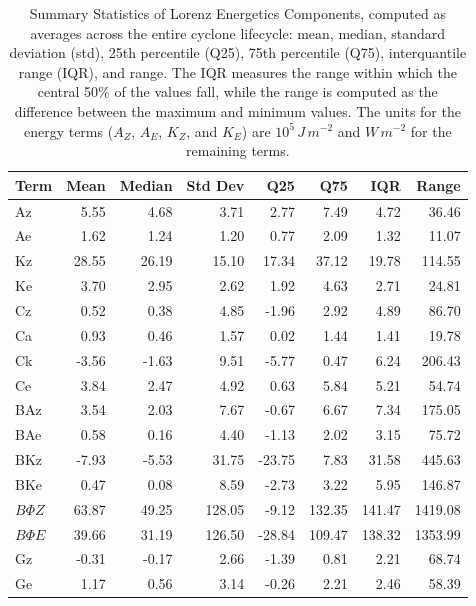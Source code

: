 \documentclass[pdflatex,sn-chicago]{sn-jnl}%
\theoremstyle{plain}
\theoremstyle{definition}
\theoremstyle{remark}
\theoremstyle{definition}
\begin{document}
\begin{table}[!htbp]
\centering
\caption[Summary Statistics of Lorenz Energetics Components]{Summary Statistics of Lorenz Energetics Components, computed as averages across the entire cyclone lifecycle: mean, median, standard deviation (std), 25th percentile (Q25), 75th percentile (Q75), interquantile range (IQR), and range. The IQR measures the range within which the central 50\% of the values fall, while the range is computed as the difference between the maximum and minimum values. The units for the energy terms ($A_Z$, $A_E$, $K_Z$, and $K_E$) are $10^5 \, J \, m^{-2}$ and $W \, m^{-2}$ for the remaining terms.}
\label{tab:lec_stats}
\begin{tabular}{lrrrrrrr}
\toprule
Term & Mean & Median & Std Dev & Q25 & Q75 & IQR & Range \\
\midrule
Az & 5.55 & 4.68 & 3.71 & 2.77 & 7.49 & 4.72 & 36.46 \\
Ae & 1.62 & 1.24 & 1.20 & 0.77 & 2.09 & 1.32 & 11.07 \\
Kz & 28.55 & 26.19 & 15.10 & 17.34 & 37.12 & 19.78 & 114.55 \\
Ke & 3.70 & 2.95 & 2.62 & 1.92 & 4.63 & 2.71 & 24.81 \\
Cz & 0.52 & 0.38 & 4.85 & -1.96 & 2.92 & 4.89 & 86.70 \\
Ca & 0.93 & 0.46 & 1.57 & 0.02 & 1.44 & 1.41 & 19.78 \\
Ck & -3.56 & -1.63 & 9.51 & -5.77 & 0.47 & 6.24 & 206.43 \\
Ce & 3.84 & 2.47 & 4.92 & 0.63 & 5.84 & 5.21 & 54.74 \\
BAz & 3.54 & 2.03 & 7.67 & -0.67 & 6.67 & 7.34 & 175.05 \\
BAe & 0.58 & 0.16 & 4.40 & -1.13 & 2.02 & 3.15 & 75.72 \\
BKz & -7.93 & -5.53 & 31.75 & -23.75 & 7.83 & 31.58 & 445.63 \\
BKe & 0.47 & 0.08 & 8.59 & -2.73 & 3.22 & 5.95 & 146.87 \\
$B\Phi Z$ & 63.87 & 49.25 & 128.05 & -9.12 & 132.35 & 141.47 & 1419.08 \\
$B\Phi E$ & 39.66 & 31.19 & 126.50 & -28.84 & 109.47 & 138.32 & 1353.99 \\
Gz & -0.31 & -0.17 & 2.66 & -1.39 & 0.81 & 2.21 & 68.74 \\
Ge & 1.17 & 0.56 & 3.14 & -0.26 & 2.21 & 2.46 & 58.39 \\

\end{tabular}
\end{table}
\end{document}
